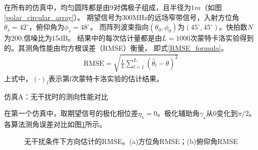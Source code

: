 \documentclass[master]{thesis-uestc}
\begin{document}
在所有的仿真中，均匀圆阵都是由$9$对偶极子组成，且半径为$1m$（如图\ref{polar_circular_array}）。
期望信号为300MHz的远场窄带信号，入射方位角$\theta_s=42^\circ$，俯仰角为$\phi_s=48^\circ$。
而阵列波束指向$(\theta_0,\phi_0)$为$(45^\circ,45^\circ)$。快拍数$N$为200.信噪比为15dB。
结果中的每次估计量都是由$L=1000$次蒙特卡洛实验得到的。其测角性能由均方根误差（RMSE）衡量，
即式\eqref{RMSE_formula}。
\begin{equation}\label{RMSE_formula}
    \begin{aligned}
        \text{RMSE} = \sqrt{\frac{1}{L}\sum_{l=1}^L\left(\hat{\theta}_l-\theta\right)^2}
    \end{aligned}
\end{equation}
上式中，$(\cdot)_l$表示第$l$次蒙特卡洛实验的估计结果。

仿真A：无干扰时的测向性能对比

在第一个仿真中，取期望信号的极化相位差$\eta_s=0$。极化辅助角$\gamma_s$从$0$变化到$\pi/2$。
各算法测角误差对比如图\ref{Polar_RMSE_jammer_free}所示。
\begin{figure}[h]
    \caption{无干扰条件下方向估计的RMSE。(a)方位角RMSE；(b)俯仰角RMSE}
    \label{Polar_RMSE_jammer_free}
\end{figure}
\end{document}

